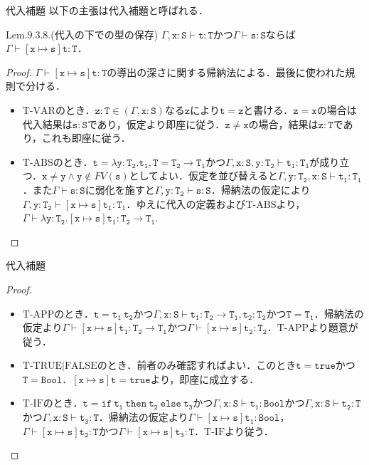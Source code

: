 \documentclass[9pt]{beamer}
\begin{document}
\begin{frame}{代入補題}
	以下の主張は代入補題と呼ばれる．
\begin{alertblock}{Lem.9.3.8.(代入の下での型の保存)}
$\Gamma,\mathtt{x:S\vdash t:T}$かつ$\Gamma\vdash\mathtt{s:S}$ならば$\Gamma\vdash\mathtt{\left[x\mapsto s\right] t:T}$．
\end{alertblock}
\begin{proof}
$\Gamma\vdash\mathtt{\left[x\mapsto s\right] t:T}$の導出の深さに関する帰納法による．最後に使われた規則で分ける．
\begin{itemize}
\item $\mathrm{T}$-$\mathrm{VAR}$のとき．$\mathtt{z:T}\in\left(\Gamma, \mathtt{x:S}\right)$なる$\mathtt{z}$により$\mathtt{t = z}$と書ける．$\mathtt{z = x}$の場合は代入結果は$\mathtt{s:S}$であり，仮定より即座に従う．$\mathtt{z\neq x}$の場合，結果は$\mathtt{z:T}$であり，これも即座に従う．
\item $\mathrm{T}$-$\mathrm{ABS}$のとき．$\mathtt{t= \lambda y:T_{2}.t_{1}, T = T_{2}\rightarrow T_{1} }$かつ$\Gamma,\mathtt{x:S, y:T_{2}\vdash t_{1}:T_{1}}$が成り立つ．$\mathtt{x \neq y}\land \mathtt{y}\notin\mathrel{FV}(\mathtt{s})$としてよい．仮定を並び替えると$\Gamma, \mathtt{y:T_{2}, x:S\vdash t_{1}:T_{1}}$．また$\Gamma\vdash \mathtt{s:S}$に弱化を施すと$\Gamma, \mathtt{\mathtt{y:T_{2}\vdash s:S}}$．帰納法の仮定により$\Gamma, \mathtt{y:T_{2}\vdash\left[x\mapsto s\right]t_{1}:T_{1}}$．ゆえに代入の定義および$\mathrm{T}$-$\mathrm{ABS}$より，$\Gamma\vdash\mathtt{\lambda y:T_{2}.\left[x\mapsto s\right]t_{1}:T_{2}\rightarrow T_{1}}$.
\end{itemize}
\end{proof}
\end{frame}
\begin{frame}{代入補題}
\begin{proof}
\begin{itemize}
\item $\mathrm{T}$-$\mathrm{APP}$のとき．$\mathtt{t = t_{1}\ t_{2}}$かつ$\Gamma,\mathtt{x:S\vdash t_{1}:T_{2}\rightarrow T_{1}, t_{2}:T_{2}}$かつ$\mathtt{T = T_{1}}$．帰納法の仮定より$\Gamma\vdash\mathtt{\left[x\mapsto s\right]t_{1}:T_{2}\rightarrow T_{1}}$かつ$\Gamma\vdash\mathtt{\left[x\mapsto s\right]t_{2}:T_{2}}$．$\mathrm{T}$-$\mathrm{APP}$より題意が従う．
\item $\mathrm{T}$-$\mathrm{TRUE|FALSE}$のとき．前者のみ確認すればよい．このとき$\mathtt{t = true}$かつ$\mathtt{T  = Bool}$．$\mathtt{\left[x\mapsto s\right]t = true}$より，即座に成立する．
\item $\mathrm{T}$-$\mathrm{IF}$のとき．$\mathtt{t = if\ t_{1}\ then\ t_{2}\ else\ t_{3}}$かつ$\Gamma,\mathtt{x:S\vdash t_{1}:Bool}$かつ$\Gamma,\mathtt{x:S\vdash t_{2}:T}$かつ$\Gamma,\mathtt{x:S\vdash t_{3}:T}$．帰納法の仮定より$\Gamma\vdash\mathtt{\left[x\mapsto s\right]t_{1}:Bool}$，$\Gamma\vdash\mathtt{\left[x\mapsto s\right]t_{2}:T}$かつ$\Gamma\vdash\mathtt{\left[x\mapsto s\right]t_{3}:T}$．$\mathrm{T}$-$\mathrm{IF}$より従う．
\end{itemize}
\end{proof}
\end{frame}
\end{document}
